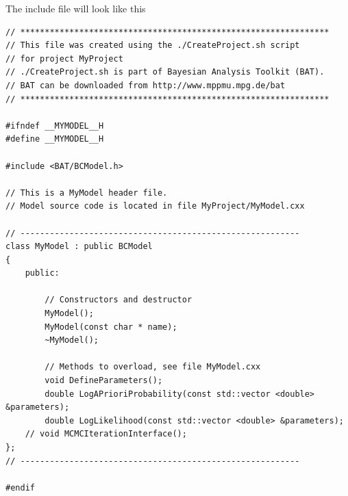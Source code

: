 \documentclass[11pt, a4paper]{article}
\begin{document}
The include file will look like this
%
\begin{verbatim}
// ***************************************************************
// This file was created using the ./CreateProject.sh script
// for project MyProject
// ./CreateProject.sh is part of Bayesian Analysis Toolkit (BAT).
// BAT can be downloaded from http://www.mppmu.mpg.de/bat
// ***************************************************************

#ifndef __MYMODEL__H
#define __MYMODEL__H

#include <BAT/BCModel.h>

// This is a MyModel header file.
// Model source code is located in file MyProject/MyModel.cxx

// ---------------------------------------------------------
class MyModel : public BCModel
{
	public:

		// Constructors and destructor
		MyModel();
		MyModel(const char * name);
		~MyModel();

		// Methods to overload, see file MyModel.cxx
		void DefineParameters();
		double LogAPrioriProbability(const std::vector <double> &parameters);
		double LogLikelihood(const std::vector <double> &parameters);
    // void MCMCIterationInterface();
};
// ---------------------------------------------------------

#endif
\end{verbatim}
\end{document}
